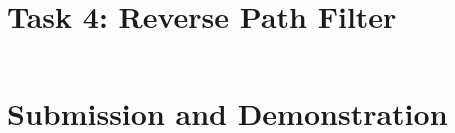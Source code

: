 \section{Task 4: Reverse Path Filter}



\begin{lstlisting}

\end{lstlisting}
 






\section{Submission and Demonstration}


\seedsubmission







